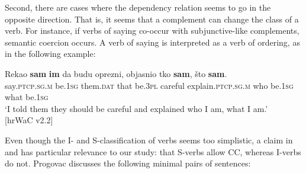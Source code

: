 Second, there are cases where the dependency relation seems to go in the opposite direction. That is, it seems that a complement can change the class of a verb. For instance, if verbs of saying co-occur with subjunctive-like complements, semantic coercion occurs. A verb of saying is interpreted as a verb of ordering, as in the following example:

\begin{exe}\ex\label{(19.05.0)}
\gll Rekao \textbf{sam} \textbf{im} da budu oprezni, objasnio tko \textbf{sam}, što \textbf{sam}.\\
say.\textsc{ptcp.sg.m} be.\textsc{1sg} them.\textsc{dat} that be.\textsc{3pl} careful explain.\textsc{ptcp.sg.m}  who be.\textsc{1sg} what be.\textsc{1sg}\\
\glt ‘I told them they should be careful and explained who I am, what I am.’  \\
\hfill [hrWaC v2.2]
\end{exe}


\noindent Even though the I- and S-classification of verbs seems too simplistic, a claim in \citet[119]{Progovac93} and \citet[146]{Progovac05} has particular relevance to our study: that S-verbs allow CC, whereas I-verbs do not. Progovac discusses the following minimal pairs of sentences:

\begin{exe}
\ex\begin{xlist}
\end{xlist}

\ex
\begin{xlist}
\end{xlist}
\end{exe}


